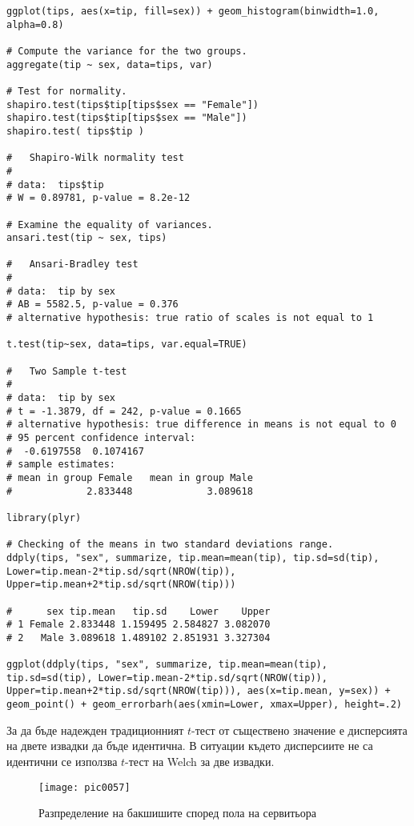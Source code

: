 \begin{lstlisting}[caption=Сравнение на две извадки, label=listing0171]
ggplot(tips, aes(x=tip, fill=sex)) + geom_histogram(binwidth=1.0, alpha=0.8)

# Compute the variance for the two groups.
aggregate(tip ~ sex, data=tips, var)

# Test for normality.
shapiro.test(tips$tip[tips$sex == "Female"])
shapiro.test(tips$tip[tips$sex == "Male"])
shapiro.test( tips$tip )

# 	Shapiro-Wilk normality test
# 
# data:  tips$tip
# W = 0.89781, p-value = 8.2e-12

# Examine the equality of variances.
ansari.test(tip ~ sex, tips)

# 	Ansari-Bradley test
# 
# data:  tip by sex
# AB = 5582.5, p-value = 0.376
# alternative hypothesis: true ratio of scales is not equal to 1

t.test(tip~sex, data=tips, var.equal=TRUE)

# 	Two Sample t-test
# 
# data:  tip by sex
# t = -1.3879, df = 242, p-value = 0.1665
# alternative hypothesis: true difference in means is not equal to 0
# 95 percent confidence interval:
#  -0.6197558  0.1074167
# sample estimates:
# mean in group Female   mean in group Male 
#             2.833448             3.089618

library(plyr)

# Checking of the means in two standard deviations range.
ddply(tips, "sex", summarize, tip.mean=mean(tip), tip.sd=sd(tip), Lower=tip.mean-2*tip.sd/sqrt(NROW(tip)), Upper=tip.mean+2*tip.sd/sqrt(NROW(tip))) 

#      sex tip.mean   tip.sd    Lower    Upper
# 1 Female 2.833448 1.159495 2.584827 3.082070
# 2   Male 3.089618 1.489102 2.851931 3.327304

ggplot(ddply(tips, "sex", summarize, tip.mean=mean(tip), tip.sd=sd(tip), Lower=tip.mean-2*tip.sd/sqrt(NROW(tip)), Upper=tip.mean+2*tip.sd/sqrt(NROW(tip))), aes(x=tip.mean, y=sex)) + geom_point() + geom_errorbarh(aes(xmin=Lower, xmax=Upper), height=.2)
\end{lstlisting}

За да бъде надежден традиционният $t$-тест от съществено значение е дисперсията на двете извадки да бъде идентична. В ситуации където дисперсиите не са идентични се използва $t$-тест на Welch за две извадки. 

\begin{figure}[h!]
  \centering
  \texttt{[image: pic0057]}
  \caption{Разпределение на бакшишите според пола на сервитьора}
\label{figure0057}
\end{figure}
\FloatBarrier

